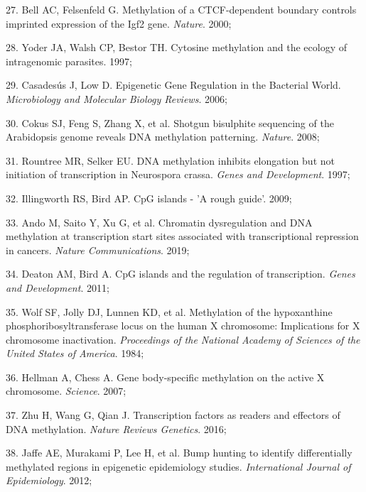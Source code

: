 \documentclass[11pt,oneside]{bristolthesis}
\newenvironment{cslreferences}%
  {}%
  {\par}
\begin{document}
\begin{cslreferences}
\leavevmode\hypertarget{ref-Bell2000}{}%
27. Bell AC, Felsenfeld G. Methylation of a CTCF-dependent boundary controls imprinted expression of the Igf2 gene. \emph{Nature}. 2000;

\leavevmode\hypertarget{ref-Yoder1997}{}%
28. Yoder JA, Walsh CP, Bestor TH. Cytosine methylation and the ecology of intragenomic parasites. 1997;

\leavevmode\hypertarget{ref-Casadesus2006}{}%
29. Casadesús J, Low D. Epigenetic Gene Regulation in the Bacterial World. \emph{Microbiology and Molecular Biology Reviews}. 2006;

\leavevmode\hypertarget{ref-Cokus2008}{}%
30. Cokus SJ, Feng S, Zhang X, et al. Shotgun bisulphite sequencing of the Arabidopsis genome reveals DNA methylation patterning. \emph{Nature}. 2008;

\leavevmode\hypertarget{ref-Rountree1997}{}%
31. Rountree MR, Selker EU. DNA methylation inhibits elongation but not initiation of transcription in Neurospora crassa. \emph{Genes and Development}. 1997;

\leavevmode\hypertarget{ref-Illingworth2009}{}%
32. Illingworth RS, Bird AP. CpG islands - 'A rough guide'. 2009;

\leavevmode\hypertarget{ref-Ando2019}{}%
33. Ando M, Saito Y, Xu G, et al. Chromatin dysregulation and DNA methylation at transcription start sites associated with transcriptional repression in cancers. \emph{Nature Communications}. 2019;

\leavevmode\hypertarget{ref-Deaton2011}{}%
34. Deaton AM, Bird A. CpG islands and the regulation of transcription. \emph{Genes and Development}. 2011;

\leavevmode\hypertarget{ref-Wolf1984}{}%
35. Wolf SF, Jolly DJ, Lunnen KD, et al. Methylation of the hypoxanthine phosphoribosyltransferase locus on the human X chromosome: Implications for X chromosome inactivation. \emph{Proceedings of the National Academy of Sciences of the United States of America}. 1984;

\leavevmode\hypertarget{ref-Hellman2007}{}%
36. Hellman A, Chess A. Gene body-specific methylation on the active X chromosome. \emph{Science}. 2007;

\leavevmode\hypertarget{ref-Zhu2016}{}%
37. Zhu H, Wang G, Qian J. Transcription factors as readers and effectors of DNA methylation. \emph{Nature Reviews Genetics}. 2016;

\leavevmode\hypertarget{ref-Jaffe2012}{}%
38. Jaffe AE, Murakami P, Lee H, et al. Bump hunting to identify differentially methylated regions in epigenetic epidemiology studies. \emph{International Journal of Epidemiology}. 2012;


\end{cslreferences}
\end{document}
